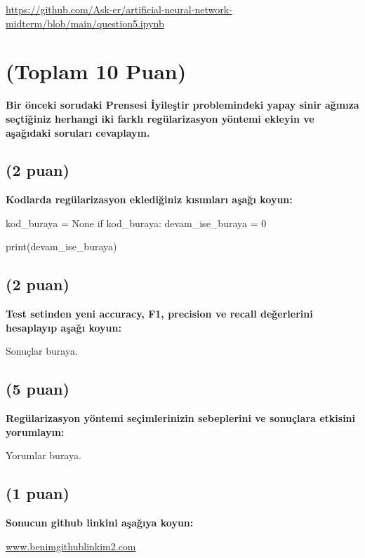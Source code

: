 \documentclass[11pt]{article}
\begin{document}
\url{https://github.com/Ask-er/artificial-neural-network-midterm/blob/main/question5.ipynb}

\section{(Toplam 10 Puan)} \textbf{Bir önceki sorudaki Prensesi İyileştir problemindeki yapay sinir ağınıza seçtiğiniz herhangi iki farklı regülarizasyon yöntemi ekleyin ve aşağıdaki soruları cevaplayın.} 

\subsection{(2 puan)} \textbf{Kodlarda regülarizasyon eklediğiniz kısımları aşağı koyun:} 

\begin{python}
kod_buraya = None
if kod_buraya:
    devam_ise_buraya = 0

print(devam_ise_buraya)
\end{python}

\subsection{(2 puan)} \textbf{Test setinden yeni accuracy, F1, precision ve recall değerlerini hesaplayıp aşağı koyun:}

Sonuçlar buraya.

\subsection{(5 puan)} \textbf{Regülarizasyon yöntemi seçimlerinizin sebeplerini ve sonuçlara etkisini yorumlayın:}

Yorumlar buraya.

\subsection{(1 puan)} \textbf{Sonucun github linkini  aşağıya koyun:}

\url{www.benimgithublinkim2.com}
\end{document}
